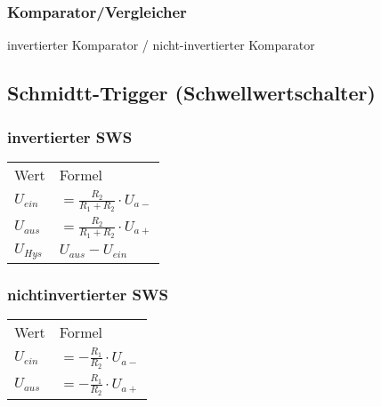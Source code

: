     \subsubsection{Komparator/Vergleicher}
        \begin{center}
            invertierter Komparator / nicht-invertierter Komparator
        \end{center}
\subsection{Schmidtt-Trigger (Schwellwertschalter)}
    \begin{minipage}[t][0.4\pdfpageheight][t]{0.5\columnwidth} %
        \subsubsection{invertierter SWS}
        \renewcommand{\arraystretch}{1.1}
        \begin{table}[H]
            \begin{tabularx}{\columnwidth}{l l}
                Wert      & Formel \\
                $U_{ein}$ & $=\frac{R_2}{R_1+R_2}\cdot U_{a-}$ \\
                $U_{aus}$ & $=\frac{R_2}{R_1+R_2}\cdot U_{a+}$ \\
                $U_{Hys}$ & $U_{aus}-U_{ein}$
            \end{tabularx}
        \end{table}
    \end{minipage}
    \begin{minipage}[t][0.4\pdfpageheight][t]{0.5\columnwidth}
        \subsubsection{nichtinvertierter SWS}
        \renewcommand{\arraystretch}{1.1}
        \begin{table}[H]
            \begin{tabularx}{\columnwidth}{l l}
                Wert      & Formel \\
                $U_{ein}$ & $=-\frac{R_1}{R_2}\cdot U_{a-}$ \\
                $U_{aus}$ & $=-\frac{R_1}{R_2}\cdot U_{a+}$ \\
            \end{tabularx}
        \end{table}
    \end{minipage}
